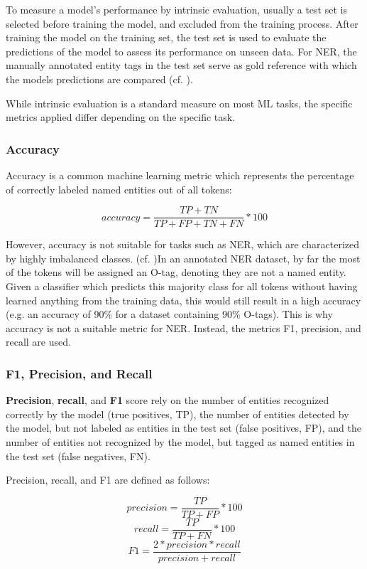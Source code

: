 To measure a model's performance by intrinsic evaluation, usually a test set is selected before training the model, and excluded from the training process. After training the model on the training set, the test set is used to evaluate the predictions of the model to assess its performance on unseen data.  For NER, the manually annotated entity tags in the test set serve as gold reference with which the models predictions are compared (cf. \cite[241]{zong_information_2021}). 

While intrinsic evaluation is a standard measure on most ML tasks, the specific metrics applied differ depending on the specific task. 

\subsubsection{Accuracy}
Accuracy is a common machine learning metric which represents the percentage of correctly labeled named entities out of all tokens: 

$$ accuracy = \frac {TP + TN} {TP + FP + TN + FN} *100 $$

However, accuracy is not suitable for tasks such as NER,  which are characterized by highly imbalanced classes. (cf. \cite[65-66]{jurafsky_2021_4})In an annotated NER dataset, by far the most of the tokens will be assigned an O-tag, denoting they are not a named entity. Given a classifier which predicts this majority class for all tokens without having learned anything from the training data, this would still result in a high accuracy (e.g. an accuracy of 90\% for a dataset containing 90\% O-tags). This is why accuracy is not a suitable metric for NER. Instead, the metrics F1, precision, and recall are used.

\subsubsection{F1, Precision, and Recall}
\textbf{Precision}, \textbf{recall}, and \textbf{F1} score rely on the number of entities recognized correctly by the model (true positives, TP), the number of entities detected by the model, but not labeled as entities in the test set (false positives, FP), and the number of entities not recognized by the model, but tagged as named entities in the test set (false negatives, FN). 

Precision, recall, and F1 are defined as follows: 

$$ precision = \frac {TP} {TP + FP} * 100 $$
$$ recall = \frac {TP}  {TP + FN} * 100 $$
$$ F1 = \frac {2 * precision * recall} {precision + recall} $$

